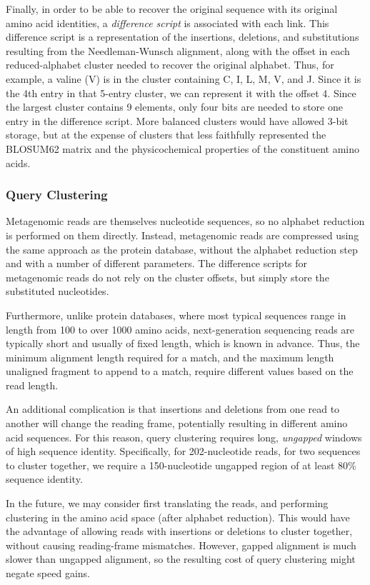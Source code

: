 \documentclass[review,preprint,12pt]{elsarticle}
\theoremstyle{definition}
\theoremstyle{remark}
\begin{document}
Finally, in order to be able to recover the original sequence with its original
amino acid identities, a \textit{difference script} is associated with each
link.
This difference script is a representation of the insertions, deletions, and
substitutions resulting from the Needleman-Wunsch alignment, along with the
offset in each reduced-alphabet cluster needed to recover the original alphabet.
Thus, for example, a valine (V) is in the cluster containing C, I, L, M, V, and 
J.
Since it is the 4th entry in that 5-entry cluster, we can represent it with
the offset 4.
Since the largest cluster contains 9 elements, only four bits are needed to
store one entry in the difference script.
More balanced clusters would have allowed 3-bit storage, but at the expense of
clusters that less faithfully represented the BLOSUM62 matrix and the
physicochemical properties of the constituent amino acids.



\subsubsection{Query Clustering}

Metagenomic reads are themselves nucleotide sequences, so no alphabet reduction
is performed on them directly.
Instead, metagenomic reads are compressed using the same approach as the
protein database, without the alphabet reduction step and with a number of
different parameters.
The difference scripts for metagenomic reads do not rely on the cluster offsets,
but simply store the substituted nucleotides.

Furthermore, unlike protein databases, where most typical sequences range in 
length from 100 to over 1000 amino acids, next-generation sequencing reads are 
typically short and usually of fixed length, which is known in advance.
Thus, the minimum alignment length required for a match, and the maximum
length unaligned fragment to append to a match, require different values based
on the read length.

An additional complication is that insertions and deletions from one read to
another will change the reading frame, potentially resulting in 
different amino acid sequences.
For this reason, query clustering requires long, \emph{ungapped} windows of high
sequence identity.
Specifically, for 202-nucleotide reads, for two sequences to cluster together,
we require a 150-nucleotide ungapped region of at least 80\% sequence identity.

In the future, we may consider first translating the reads, and performing
clustering in the amino acid space (after alphabet reduction).
This would have the advantage of allowing reads with insertions or deletions
to cluster together, without causing reading-frame mismatches.
However, gapped alignment is much slower than ungapped alignment,
so the resulting cost of query clustering might negate speed gains.
\end{document}
